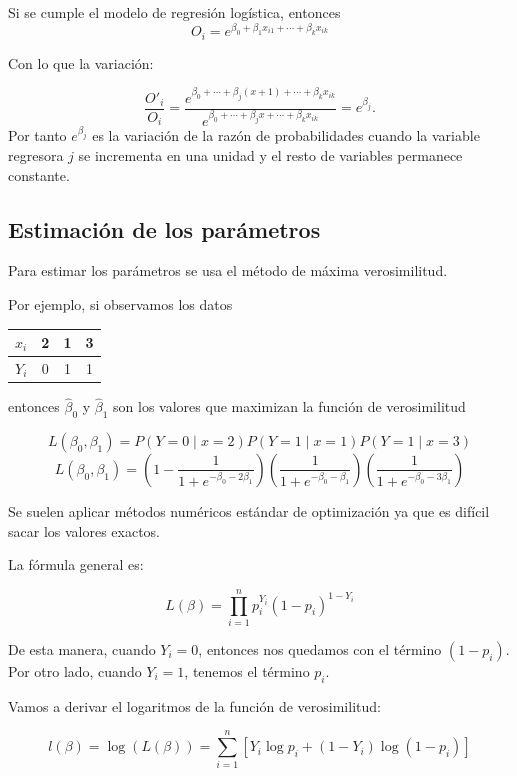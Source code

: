 Si se cumple el modelo de regresión logística, entonces
\[
O_i =  e^{\beta_0  + \beta_1x_{i1} + \cdots + \beta_kx_{ik}}
\]

Con lo que la variación:

\[
\frac{O'_i}{O_i} = \frac{e^{\beta_0+\cdots+\beta_j(x+1)+\cdots+\beta_kx_{ik}}}{e^{\beta_0+\cdots+\beta_jx+\cdots+\beta_kx_{ik}}}= e^{\beta_j}.
\]  
Por tanto $e^{\beta_j}$ es la variación de la razón de probabilidades cuando la variable regresora $j$ se incrementa en una unidad y el resto de variables permanece constante. 


\subsection{Estimación de los parámetros}


Para estimar los parámetros se usa el método de máxima verosimilitud.



Por ejemplo, si observamos los datos

\begin{center}
\begin{tabular}{c|ccc}
$x_i$ & 2 & 1 & 3 \\  \hline
$Y_i$ & 0 & 1 & 1
\end{tabular}
\end{center}

entonces $\hat{\beta}_0$ y $\hat{\beta}_1$ son los valores que maximizan la función de verosimilitud


\[
L(\beta_0,\beta_1) = P(Y=0 \mid x = 2)P(Y=1 \mid x = 1)P(Y=1 \mid x = 3)
\]
\[
L(\beta_0,\beta_1) = \left(1-\frac{1}{1+e^{-\beta_0-2\beta_1}}\right)
\left(\frac{1}{1+e^{-\beta_0-\beta_1}}\right)
\left(\frac{1}{1+e^{-\beta_0-3\beta_1}}\right)
\]

Se suelen aplicar métodos numéricos estándar de optimización ya que es difícil sacar los valores exactos.


La fórmula general es:

\[ L(β) = \prod_{i=1}^n p_i^{Y_i}(1-p_i)^{1-Y_i}\]

De esta manera, cuando $Y_i = 0$, entonces nos quedamos con el término $(1-p_i)$. Por otro lado, cuando $Y_i = 1$, tenemos el término $p_i$.


Vamos a derivar el logaritmos de la función de verosimilitud:

\[
l(β) = \log (L(β)) = \sum_{i=1}^n \left[ Y_i\log p_i + (1-Y_i)\log (1-p_i) \right]
\]

